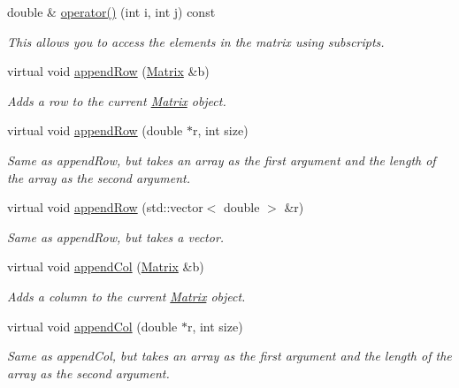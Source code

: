 \begin{DoxyCompactItemize}
double \& \hyperlink{class_matrix_a3d361fded5f8992d2202894ca141eb72}{operator()} (int i, int j) const 
\begin{DoxyCompactList}\small\item\em This allows you to access the elements in the matrix using subscripts. \item\end{DoxyCompactList}\item 
virtual void \hyperlink{class_matrix_a20c175983a6b23a83fccfe8f726b3b07}{appendRow} (\hyperlink{class_matrix}{Matrix} \&b)
\begin{DoxyCompactList}\small\item\em Adds a row to the current \hyperlink{class_matrix}{Matrix} object. \item\end{DoxyCompactList}\item 
virtual void \hyperlink{class_matrix_a55104cb3fcf93a887ac713955fc0f5c9}{appendRow} (double $\ast$r, int size)
\begin{DoxyCompactList}\small\item\em Same as appendRow, but takes an array as the first argument and the length of the array as the second argument. \item\end{DoxyCompactList}\item 
virtual void \hyperlink{class_matrix_a934b0686d9a2b971e9740b9a29224a54}{appendRow} (std::vector$<$ double $>$ \&r)
\begin{DoxyCompactList}\small\item\em Same as appendRow, but takes a vector. \item\end{DoxyCompactList}\item 
virtual void \hyperlink{class_matrix_a6d7061bb02cf34f6c79a01ff25b41e84}{appendCol} (\hyperlink{class_matrix}{Matrix} \&b)
\begin{DoxyCompactList}\small\item\em Adds a column to the current \hyperlink{class_matrix}{Matrix} object. \item\end{DoxyCompactList}\item 
virtual void \hyperlink{class_matrix_aae8efe9de26740e3c953e43de55963b2}{appendCol} (double $\ast$r, int size)
\begin{DoxyCompactList}\small\item\em Same as appendCol, but takes an array as the first argument and the length of the array as the second argument. \item\end{DoxyCompactList}\item 

\end{DoxyCompactItemize}
